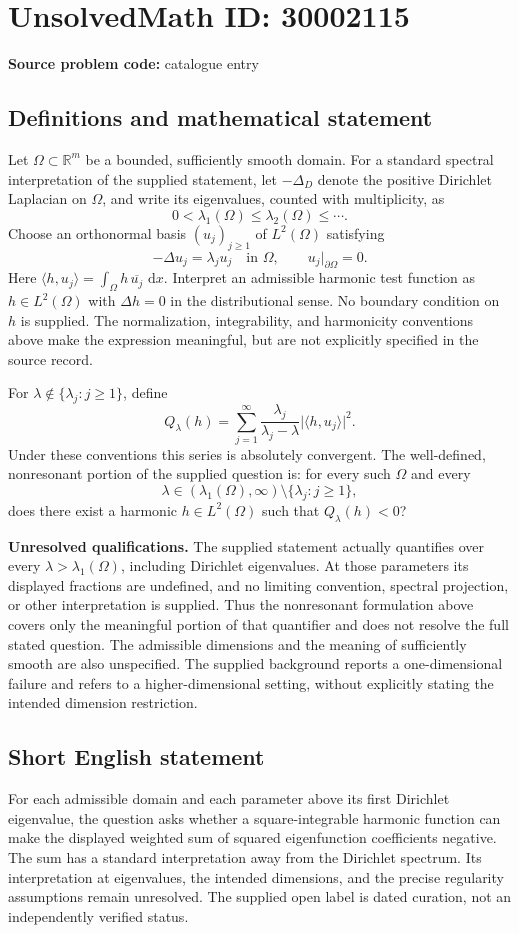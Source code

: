 \documentclass[11pt]{article}
\newcommand{\R}{\mathbb{R}}
\newcommand{\dd}{\,\mathrm{d}}
\begin{document}
\section*{UnsolvedMath ID: 30002115}
\textbf{Source problem code:} catalogue entry
\subsection{Definitions and mathematical statement}
Let \(\Omega\subset\R^m\) be a bounded, sufficiently smooth domain. For a standard spectral interpretation of the supplied statement, let \(-\Delta_D\) denote the positive Dirichlet Laplacian on \(\Omega\), and write its eigenvalues, counted with multiplicity, as
\[
0<\lambda_1(\Omega)\leq\lambda_2(\Omega)\leq\cdots.
\]
Choose an orthonormal basis \((u_j)_{j\geq1}\) of \(L^2(\Omega)\) satisfying
\[
-\Delta u_j=\lambda_j u_j\quad\text{in }\Omega,
\qquad u_j|_{\partial\Omega}=0.
\]
Here \(\langle h,u_j\rangle=\int_\Omega h\,\overline{u_j}\,\dd x\). Interpret an admissible harmonic test function as \(h\in L^2(\Omega)\) with \(\Delta h=0\) in the distributional sense. No boundary condition on \(h\) is supplied. The normalization, integrability, and harmonicity conventions above make the expression meaningful, but are not explicitly specified in the source record.

For \(\lambda\notin\{\lambda_j:j\geq1\}\), define
\[
Q_\lambda(h)=\sum_{j=1}^{\infty}
\frac{\lambda_j}{\lambda_j-\lambda}
\bigl|\langle h,u_j\rangle\bigr|^2.
\]
Under these conventions this series is absolutely convergent. The well-defined, nonresonant portion of the supplied question is: for every such \(\Omega\) and every
\[
\lambda\in(\lambda_1(\Omega),\infty)
\setminus\{\lambda_j:j\geq1\},
\]
does there exist a harmonic \(h\in L^2(\Omega)\) such that \(Q_\lambda(h)<0\)?

\textbf{Unresolved qualifications.} The supplied statement actually quantifies over every \(\lambda>\lambda_1(\Omega)\), including Dirichlet eigenvalues. At those parameters its displayed fractions are undefined, and no limiting convention, spectral projection, or other interpretation is supplied. Thus the nonresonant formulation above covers only the meaningful portion of that quantifier and does not resolve the full stated question. The admissible dimensions and the meaning of sufficiently smooth are also unspecified. The supplied background reports a one-dimensional failure and refers to a higher-dimensional setting, without explicitly stating the intended dimension restriction.
\subsection{Short English statement}
For each admissible domain and each parameter above its first Dirichlet eigenvalue, the question asks whether a square-integrable harmonic function can make the displayed weighted sum of squared eigenfunction coefficients negative. The sum has a standard interpretation away from the Dirichlet spectrum. Its interpretation at eigenvalues, the intended dimensions, and the precise regularity assumptions remain unresolved. The supplied open label is dated curation, not an independently verified status.
\end{document}
